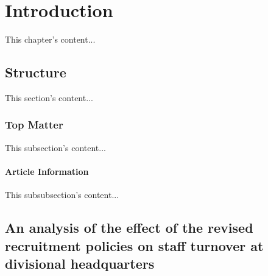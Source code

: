 \documentclass{book}
\begin{document}
\setcounter{secnumdepth}{1}

\chapter{Introduction}
This chapter's content...

\section{Structure}
This section's content...

\subsection{Top Matter}
This subsection's content...

\subsubsection{Article Information}
This subsubsection's content...

\section[Effect on staff turnover]{An analysis of the
effect of the revised recruitment policies on staff
turnover at divisional headquarters}
\end{document}
